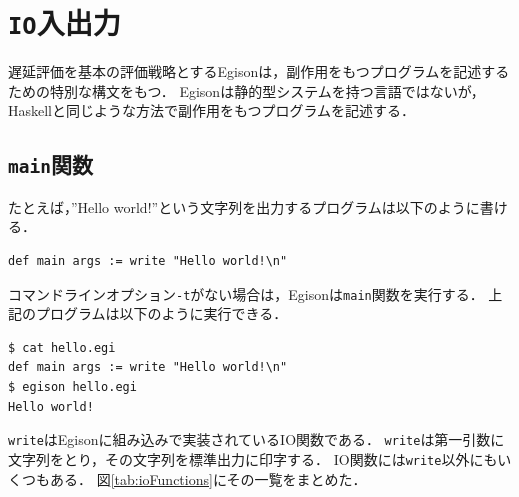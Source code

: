 \section{\texttt{IO}入出力}

遅延評価を基本の評価戦略とするEgisonは，副作用をもつプログラムを記述するための特別な構文をもつ．
Egisonは静的型システムを持つ言語ではないが，Haskellと同じような方法で副作用をもつプログラムを記述する．

\subsection{\texttt{main}関数}

たとえば，''Hello world!''という文字列を出力するプログラムは以下のように書ける．
\begin{lstlisting}[language=egison,numbers=none]
def main args := write "Hello world!\n"
\end{lstlisting}
コマンドラインオプション\lstinline{-t}がない場合は，Egisonは\lstinline{main}関数を実行する．
上記のプログラムは以下のように実行できる．
\begin{lstlisting}[language=egison,numbers=none]
$ cat hello.egi
def main args := write "Hello world!\n"
$ egison hello.egi
Hello world!
\end{lstlisting}
\lstinline{write}はEgisonに組み込みで実装されているIO関数である．
\lstinline{write}は第一引数に文字列をとり，その文字列を標準出力に印字する．
IO関数には\lstinline{write}以外にもいくつもある．
図\ref{tab:ioFunctions}にその一覧をまとめた．

